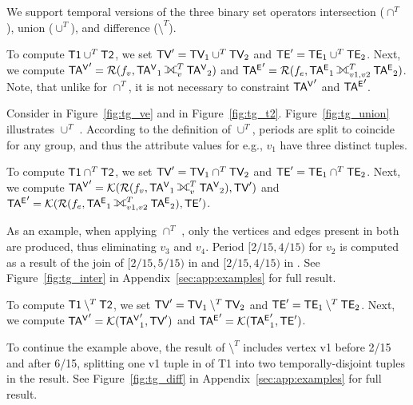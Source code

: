 We support temporal versions of the three binary set operators
intersection ($\cap^T$), union ($\cup^T$), and difference
($\setminus^T$).


To compute $\textsf{T1} \cup^T \textsf{T2}$, we set $\textsf{TV}' = \textsf{TV}_1 \cup^T
\textsf{TV}_2$ and $\textsf{TE}' = \textsf{TE}_1 \cup^T \textsf{TE}_2$.  Next, we compute $\tav' =
\resolve{f_v}{\tav_1 \fullouterjoin^T_{v} \tav_2}$ and $\tae' =
\resolve{f_e}{\tae_1 \fullouterjoin^T_{v1,v2} \tae_2}$.  Note, that
unlike for $\cap^T$, it is not necessary to constraint $\mathsf{TA^{V}}'$ and
$\mathsf{TA^{E}}'$.

Consider  in Figure~\ref{fig:tg_ve} and  in
Figure~\ref{fig:tg_t2}.  Figure~\ref{fig:tg_union} illustrates
 $\cup^T$ .  According to the definition of
$\cup^T$, periods are split to coincide for any group, and thus the
attribute values for e.g., $v_1$ have three distinct tuples.

To compute $\textsf{T1} \cap^T \textsf{T2}$, we set $\textsf{TV}' = \textsf{TV}_1 \cap^T
\textsf{TV}_2$ and $\textsf{TE}' = \textsf{TE}_1 \cap^T \textsf{TE}_2$.  Next, we compute $\tav' =
\constr{\resolve{f_v}{\tav_1 \fullouterjoin^T_{v} \tav_2}}{\tv'}$ and
$\tae' = \constr{\resolve{f_e}{\tae_1 \fullouterjoin^T_{v1,v2}
    \tae_2}}{\te'}$.

As an example, when applying  $\cap^T$ , only the
vertices and edges present in both \tgs are produced, thus eliminating
$v_3$ and $v_4$.  Period $[2/15, 4/15)$ for $v_2$ is computed as a
  result of the join of $[2/15, 5/15)$ in  and [$2/15,
      4/15)$ in .  See Figure~\ref{fig:tg_inter} in
      Appendix~\ref{sec:app:examples} for full result.

To compute $\textsf{T1} \setminus^T \textsf{T2}$, we set $\textsf{TV}' = \textsf{TV}_1
\setminus^T \textsf{TV}_2$ and $\textsf{TE}' = \textsf{TE}_1 \setminus^T \textsf{TE}_2$.  Next, we
compute $\mathsf{TA^{V}}' = \mathcal{K}({\mathsf{TA^{V}}}'_1,\textsf{TV}')$ and $\mathsf{TA^{E}}' =
\mathcal{K}({\mathsf{TA^{E}}}'_1,\textsf{TE}')$.

To continue the example above, the result of  $\setminus^T$
 includes vertex v1 before 2/15 and after 6/15, splitting
one v1 tuple in \tv of T1 into two temporally-disjoint tuples in the
result.  See Figure~\ref{fig:tg_diff} in
Appendix~\ref{sec:app:examples} for full result.

